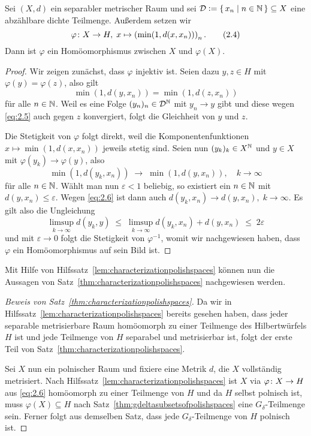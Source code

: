 \documentclass[../main/main.tex]{subfiles}
\begin{document}
	\begin{Hilfssatz}
		\label{lem:characterizationpolishspaces}
		Sei $(X, d)$ ein separabler metrischer Raum und sei 
		$\mathcal{D} \vcentcolon = \left\{\, x_n \; \middle| \; n \in \mathbb{N} \,\right\} \subseteq X$ eine abzählbare 
		dichte Teilmenge. Außerdem setzen wir
		\[\varphi \colon X \to H, \; x \mapsto \left(\min (1, d(x, x_n)) \right)_n  \text{.} \label{eq:2.4} \tag{2.4}\]
		Dann ist $\varphi$ ein Homöomorphismus zwischen $X$ und $\varphi(X)$.
	\end{Hilfssatz}
	
	\begin{proof}
		Wir zeigen zunächst, dass $\varphi$ injektiv ist. 
		Seien dazu $y, z \in H$ mit $\varphi(y) = \varphi(z)$, also gilt
		\[\min (1, d(y, x_n)) = \min (1, d(z, x_n)) \label{eq:2.5} \tag{2.5}\]
		für alle $n \in \mathbb{N}$. Weil es eine Folge $(y_n)_n \in \mathcal{D}^{\mathbb{N}}$ mit 
		$y_n \to y$ gibt und diese wegen \eqref{eq:2.5} auch gegen $z$ 
		konvergiert, folgt die Gleichheit von $y$ und $z$.
		
		Die Stetigkeit von $\varphi$ folgt direkt, weil die 
		Komponentenfunktionen $x \mapsto \min (1, d(x, x_n))$ jeweils stetig sind. 
		Seien nun $(y_k)_k \in X^{\mathbb{N}}$ und $y \in X$ mit $\varphi(y_k) \to \varphi(y)$, 
		also
		\[\min (1, d(y_k, x_n)) \; \to \; \min (1, d(y, x_n)), 
		\quad k \to \infty \label{eq:2.6} \tag{2.6}\]
		für alle $n \in \mathbb{N}$. Wählt man nun $\varepsilon < 1$ beliebig, 
		so existiert ein $n \in \mathbb{N}$ mit $d(y, x_n) \leq \varepsilon$. 
		Wegen \eqref{eq:2.6} ist dann auch
		$d(y_k, x_n) \to d(y, x_n), \; k \to \infty$. Es gilt also die Ungleichung
		$$\limsup_{k \to \infty} d(y_k, y) \; \leq \; 
		\limsup_{k \to \infty} d(y_k, x_n) + d(y, x_n) \; \leq \; 2\varepsilon$$
		und mit $\varepsilon \to 0$ folgt die Stetigkeit von $\varphi^{-1}$, 
		womit wir nachgewiesen haben, dass $\varphi$ ein Homöomorphismus auf sein Bild ist. 
	\end{proof}

	Mit Hilfe von Hilfssatz~\ref{lem:characterizationpolishspaces} können nun die Aussagen von
	Satz~\ref{thm:characterizationpolishspaces} nachgewiesen werden.
	
	\begin{proof}[Beweis von Satz~\ref{thm:characterizationpolishspaces}]
		Da wir in Hilfssatz~\ref{lem:characterizationpolishspaces} bereits 
		gesehen haben, dass jeder separable metrisierbare Raum homöomorph zu einer 
		Teilmenge des Hilbertwürfels $H$ ist und jede Teilmenge von $H$ separabel und metrisierbar ist,
		folgt der erste Teil von Satz~\ref{thm:characterizationpolishspaces}. 
		
		Sei $X$ nun ein polnischer Raum und fixiere eine Metrik $d$, die $X$ vollständig metrisiert. 
		Nach Hilfssatz~\ref{lem:characterizationpolishspaces} ist $X$ via $\varphi \colon X \to H$ aus \eqref{eq:2.6}
		homöomorph zu einer Teilmenge von $H$ und da $H$ selbst polnisch ist, muss $\varphi(X) \subseteq H$ nach 
		Satz~\ref{thm:gdeltasubsetsofpolishspaces} eine $G_\delta$-Teilmenge sein.
		Ferner folgt aus demselben Satz, dass jede $G_\delta$-Teilmenge von $H$ polnisch ist.
	\end{proof}
\end{document}
